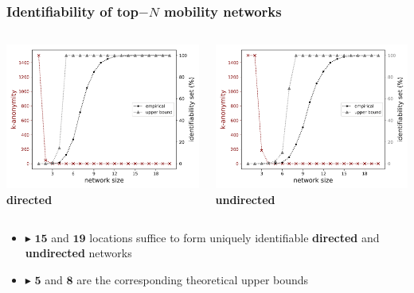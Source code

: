 \documentclass[hyperref={colorlinks = true},unknownkeysallowed]{beamer}
\begin{document}
\begin{frame}
	\frametitle{Identifiability of  top$-N$ mobility networks}
		\begin{columns}
		\begin{column}[t]{0.49\textwidth}
			\centering \includegraphics[width=1.05\textwidth]{figs/k_anonymity_dir_.pdf}
			\\ \textbf{directed}
		\end{column}
		\begin{column}[t]{0.49\textwidth}
			\centering \includegraphics[width=1.05\textwidth]{figs/k_anonymity_undirected_.pdf}
			\\ \textbf{undirected}
		\end{column}
	\end{columns}
\begin{itemize}
	\item  $\blacktriangleright$ $\mathbf{15}$ and $\mathbf{19}$ locations suffice to form uniquely identifiable
\textbf{directed} and \textbf{undirected} networks 
\item  $\blacktriangleright$ $\mathbf{5}$ and $\mathbf{8}$  are the corresponding theoretical upper bounds
\end{itemize}
\end{frame}
\end{document}
